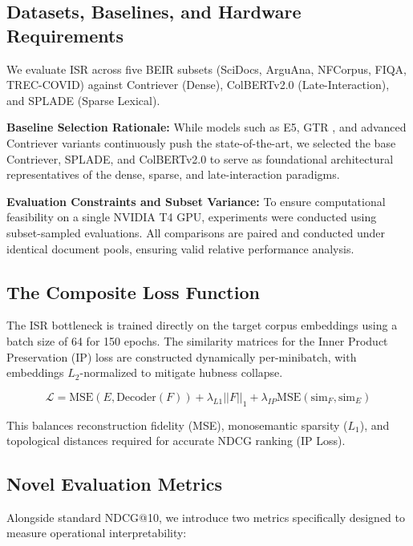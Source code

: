 \documentclass[sigconf,authordraft]{acmart}
\begin{document}
\subsection{Datasets, Baselines, and Hardware Requirements}
We evaluate ISR across five BEIR subsets \cite{thakur2021} (SciDocs, ArguAna, NFCorpus, FIQA, TREC-COVID) against Contriever (Dense), ColBERTv2.0 \cite{khattab2020} (Late-Interaction), and SPLADE \cite{formal2021} (Sparse Lexical).

\textbf{Baseline Selection Rationale:} While models such as E5, GTR \cite{wang2022}, and advanced Contriever variants continuously push the state-of-the-art, we selected the base Contriever, SPLADE, and ColBERTv2.0 to serve as foundational architectural representatives of the dense, sparse, and late-interaction paradigms.

\textbf{Evaluation Constraints and Subset Variance:} To ensure computational feasibility on a single NVIDIA T4 GPU, experiments were conducted using subset-sampled evaluations. All comparisons are paired and conducted under identical document pools, ensuring valid relative performance analysis.

\subsection{The Composite Loss Function}
The ISR bottleneck is trained directly on the target corpus embeddings using a batch size of 64 for 150 epochs. The similarity matrices for the Inner Product Preservation (IP) loss are constructed dynamically per-minibatch, with embeddings $L_2$-normalized to mitigate hubness collapse.

\begin{equation}
\mathcal{L} = \text{MSE}(E, \text{Decoder}(F)) + \lambda_{L1} ||F||_1 + \lambda_{IP} \text{MSE}(\text{sim}_F, \text{sim}_E)
\end{equation}

This balances reconstruction fidelity (MSE), monosemantic sparsity ($L_1$), and topological distances required for accurate NDCG ranking (IP Loss).

\subsection{Novel Evaluation Metrics}
Alongside standard NDCG@10, we introduce two metrics specifically designed to measure operational interpretability:
\end{document}
